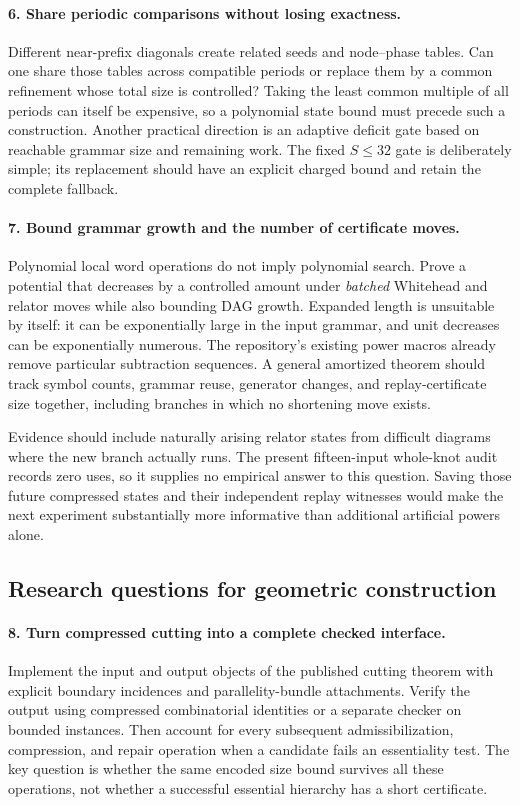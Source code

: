 \paragraph{6. Share periodic comparisons without losing exactness.}
Different near-prefix diagonals create related seeds and node--phase
tables. Can one share those tables across compatible periods or replace
them by a common refinement whose total size is controlled? Taking the
least common multiple of all periods can itself be expensive, so a
polynomial state bound must precede such a construction. Another
practical direction is an adaptive deficit gate based on reachable
grammar size and remaining work. The fixed $S\le32$ gate is deliberately
simple; its replacement should have an explicit charged bound and retain
the complete fallback.

\paragraph{7. Bound grammar growth and the number of certificate moves.}
Polynomial local word operations do not imply polynomial search. Prove
a potential that decreases by a controlled amount under \emph{batched}
Whitehead and relator moves while also bounding DAG growth. Expanded
length is unsuitable by itself: it can be exponentially large in the
input grammar, and unit decreases can be exponentially numerous.
The repository's existing power macros already remove particular
subtraction sequences. A general amortized theorem should track
symbol counts, grammar reuse, generator changes, and replay-certificate
size together, including branches in which no shortening move exists.

Evidence should include naturally arising relator states from difficult
diagrams where the new branch actually runs. The present fifteen-input
whole-knot audit records zero uses, so it supplies no empirical answer
to this question. Saving those future compressed states and their
independent replay witnesses would make the next experiment substantially
more informative than additional artificial powers alone.

\subsection{Research questions for geometric construction}

\paragraph{8. Turn compressed cutting into a complete checked interface.}
Implement the input and output objects of the published cutting theorem
with explicit boundary incidences and parallelity-bundle attachments.
Verify the output using compressed combinatorial identities or a separate
checker on bounded instances. Then account for every subsequent
admissibilization, compression, and repair operation when a candidate
fails an essentiality test. The key question is whether the same encoded
size bound survives all these operations, not whether a successful
essential hierarchy has a short certificate.

